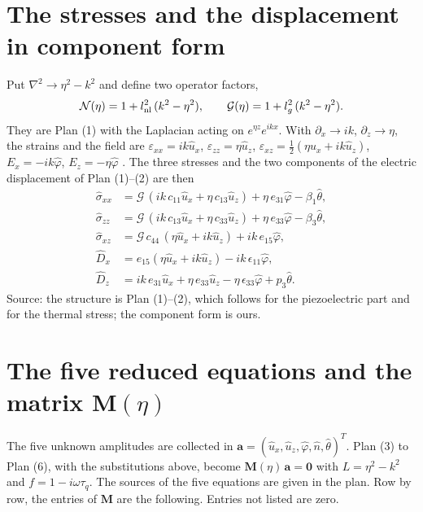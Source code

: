 \documentclass[11pt]{article}
\begin{document}
\section{The stresses and the displacement in component form}

Put $\nabla^2\to\eta^2-k^2$ and define two operator factors,
\begin{equation}
\mathcal N(\eta)=1+l_{\rm nl}^2\,(k^2-\eta^2),\qquad
\mathcal G(\eta)=1+l_g^2\,(k^2-\eta^2).
\label{eq:NG}
\end{equation}
They are Plan (1) with the Laplacian acting on $e^{\eta z}e^{ikx}$. With $\partial_x\to ik$, $\partial_z\to\eta$,
the strains and the field are $\varepsilon_{xx}=ik\hat u_x$, $\varepsilon_{zz}=\eta\hat u_z$,
$\varepsilon_{xz}=\tfrac12(\eta\hat u_x+ik\hat u_z)$, $E_x=-ik\hat\varphi$, $E_z=-\eta\hat\varphi$
\cite[Eq.\ (2)]{Zhu2023}. The three stresses and the two components of the electric displacement of Plan (1)--(2) are then
\begin{align}
\hat\sigma_{xx}&=\mathcal G\,(ik\,c_{11}\hat u_x+\eta\,c_{13}\hat u_z)+\eta\,e_{31}\hat\varphi-\beta_1\hat\theta,\\
\hat\sigma_{zz}&=\mathcal G\,(ik\,c_{13}\hat u_x+\eta\,c_{33}\hat u_z)+\eta\,e_{33}\hat\varphi-\beta_3\hat\theta,\\
\hat\sigma_{xz}&=\mathcal G\,c_{44}\,(\eta\hat u_x+ik\hat u_z)+ik\,e_{15}\hat\varphi,\\
\hat D_x&=e_{15}(\eta\hat u_x+ik\hat u_z)-ik\,\epsilon_{11}\hat\varphi,\\
\hat D_z&=ik\,e_{31}\hat u_x+\eta\,e_{33}\hat u_z-\eta\,\epsilon_{33}\hat\varphi+p_3\hat\theta .
\end{align}
Source: the structure is Plan (1)--(2), which follows \cite[Eq.\ (1)]{Zhu2023} for the piezoelectric part and
\cite[Eq.\ (3.1)]{Quintanilla2019} for the thermal stress; the component form is ours.

\section{The five reduced equations and the matrix $\mathbf M(\eta)$}

The five unknown amplitudes are collected in $\mathbf a=(\hat u_x,\hat u_z,\hat\varphi,\hat n,\hat\theta)^{T}$.
Plan (3) to Plan (6), with the substitutions above, become $\mathbf M(\eta)\,\mathbf a=\mathbf 0$ with
$L=\eta^2-k^2$ and $f=1-i\omega\tau_q$. The sources of the five equations are given in the plan. Row by row,
the entries of $\mathbf M$ are the following. Entries not listed are zero.
\end{document}
